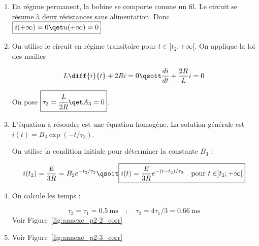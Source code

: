 \documentclass[a4paper, 10pt, garamond, oneside]{book}
\begin{document}
{\begin{enumerate}[resume]
\begin{minipage}[t]{.49\linewidth}
			      \[
				      u(t_2^-)=\frac{R/2}{R+R/2}E\qsoit
				      \boxed{u(t_2^-)=\frac{E}{3}}
			      \]

		      \end{minipage}
		      \hfill
		      \begin{minipage}[t]{.49\linewidth}
			      ~
			      \begin{center}
				      {transRL_corr5.pdf_tex}
			      \end{center}
		      \end{minipage}
		\item
		      En régime permanent, la bobine se comporte comme un fil. Le circuit se résume à deux résistances sans alimentation. Donc $\boxed{i(+\infty)=0\qet u(+\infty)=0}$
		\item
		      On utilise le circuit en régime transitoire pour $t\in]t_2,+\infty[$. On applique la loi des mailles

		      \[
			      L\diff{i}{t}+2Ri=0\qsoit \frac{di}{dt}+\frac{2R}{L}i=0
		      \]

		      On pose $\boxed{\tau_3=\cfrac{L}{2R}\qet A_3=0}$.
		\item
		      L'équation à résoudre est une équation homogène. La solution générale est $i(t)=B_3\exp(-t/\tau_3)$.

		      On utilise la condition initiale  pour déterminer la constante $B_3$ :

		      \[
			      i(t_2)=\frac{E}{3R}=B_2e^{-t_2/\tau_2}\qsoit
			      \boxed{
			      i(t)= \frac{E}{3R}e^{-(t-t_2)/\tau_3}
			      \quad\mbox{pour } t\in]t_2;+\infty[
			      }
		      \]
		\item On calcule les temps :

		      \[
			      \tau_3=\tau_1=\SI{0,5}{\milli\second}
			      \quad ;\quad
			      \tau_2=4\tau_1/3=\SI{0,66}{\milli\second}
		      \]
		      Voir Figure~\ref{fig:annexe_p2-2_corr}
		\item Voir Figure~\ref{fig:annexe_p2-3_corr}
	\end{enumerate}
}
\end{document}
